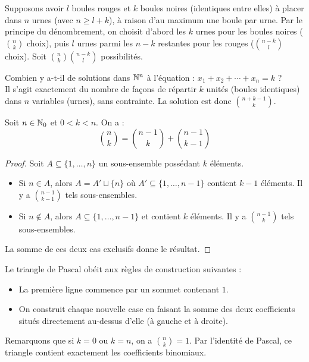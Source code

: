 \begin{exemple}
    Supposons avoir $l$ boules rouges et $k$ boules noires (identiques entre elles) à placer dans $n$ urnes (avec $n\ge l+k$), à raison d'au maximum une boule par urne. Par le principe du dénombrement, on choisit d'abord les $k$ urnes pour les boules noires ($\binom{n}{k}$ choix), puis $l$ urnes parmi les $n-k$ restantes pour les rouges ($\binom{n-k}{l}$ choix). Soit $\binom{n}{k} \binom{n-k}{l}$ possibilités.
\end{exemple}

\begin{exemple}
    Combien y a-t-il de solutions dans $\mathbb{N}^n$ à l'équation : $x_1 + x_2 + \dotsb + x_n = k$ ?\\
    Il s'agit exactement du nombre de façons de répartir $k$ unités (boules identiques) dans $n$ variables (urnes), sans contrainte. La solution est donc $\binom{n+k-1}{k}$.
\end{exemple}

\begin{proposition}
    Soit $n\in \mathbb{N}_0$ et $0<k<n$. On a :
    \[
    \binom{n}{k} = \binom{n-1}{k} + \binom{n-1}{k-1}
    \]  
\end{proposition}

\begin{proof}
    Soit $A \subseteq \{1,\dotsc, n\}$ un sous-ensemble possédant $k$ éléments. 
    \begin{itemize}
        \item Si $n \in A$, alors $A = A'\sqcup \{n\}$ où $A' \subseteq \{1,\dotsc,n-1\}$ contient $k-1$ éléments. Il y a $\binom{n-1}{k-1}$ tels sous-ensembles.
        \item Si $n \notin A$, alors $A \subseteq \{1,\dotsc, n-1\}$ et contient $k$ éléments. Il y a $\binom{n-1}{k}$ tels sous-ensembles.
    \end{itemize}
    La somme de ces deux cas exclusifs donne le résultat.
\end{proof}

\begin{definition}
    Le triangle de Pascal obéit aux règles de construction suivantes :
    \begin{itemize}
        \item La première ligne commence par un sommet contenant $1$.
        \item On construit chaque nouvelle case en faisant la somme des deux coefficients situés directement au-dessus d'elle (à gauche et à droite).
    \end{itemize}
    Remarquons que si $k = 0$ ou $k= n$, on a $\binom{n}{k} = 1$. Par l'identité de Pascal, ce triangle contient exactement les coefficients binomiaux.
\end{definition}

